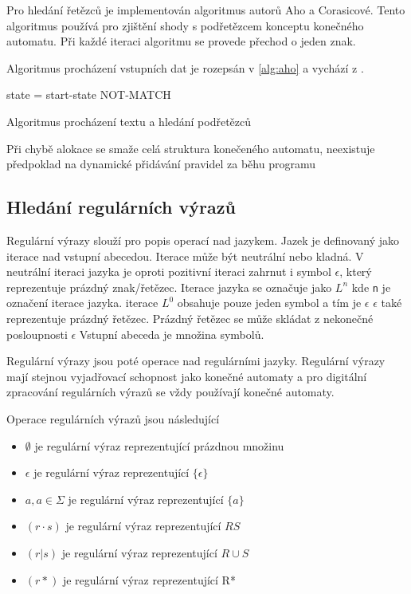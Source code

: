 Pro hledání řetězců je implementován algoritmus autorů Aho a Corasicové. Tento algoritmus používá pro zjištění shody s podřetězcem konceptu konečného automatu. Při každé iteraci algoritmu se provede přechod o jeden znak.

Algoritmus procházení vstupních dat je rozepsán v \ref{alg:aho} a vychází z \cite{aho}.

\begin{algorithm}
	state = start-state\;
	{
	}
	\Return NOT-MATCH\;
	\caption{Algoritmus procházení textu a hledání podřetězců}
\end{algorithm}\label{alg:aho}

Při chybě alokace se smaže celá struktura konečeného automatu, neexistuje předpoklad na dynamické přidávání pravidel za běhu programu

\subsection{Hledání regulárních výrazů}

Regulární výrazy slouží pro popis operací nad jazykem.
Jazek je definovaný jako iterace nad vstupní abecedou.
Iterace může  být neutrální nebo kladná.
V neutrální iteraci jazyka je oproti pozitivní iteraci zahrnut i symbol $\epsilon$,
který reprezentuje prázdný znak/řetězec.
Iterace jazyka se označuje jako $L^n$ kde \texttt{n} je označení iterace jazyka.
iterace $L^0$ obsahuje pouze jeden symbol a tím je $\epsilon$
$\epsilon$ také reprezentuje prázdný řetězec. Prázdný řetězec se může skládat z nekonečné posloupnosti $\epsilon$
Vstupní abeceda je množina symbolů.

Regulární výrazy jsou poté operace nad regulárními jazyky.
Regulární výrazy mají stejnou  vyjadřovací schopnost jako konečné automaty a pro digitální zpracování
regulárních výrazů se vždy používají konečné automaty.

Operace regulárních výrazů jsou následující

\begin{itemize}
	\item{$\emptyset$ je regulární výraz reprezentující prázdnou množinu}
	\item{$\epsilon$ je regulární výraz reprezentující $\{\epsilon\}$}
	\item{$a, a \in \Sigma$ je regulární výraz reprezentující $\{a\}$}
	\item{$(r \cdot s)$ je regulární výraz reprezentující $RS$}
	\item{$(r | s)$ je regulární výraz reprezentující $R \cup S$}
	\item{$(r*)$ je regulární výraz reprezentující R*}
\end{itemize}

